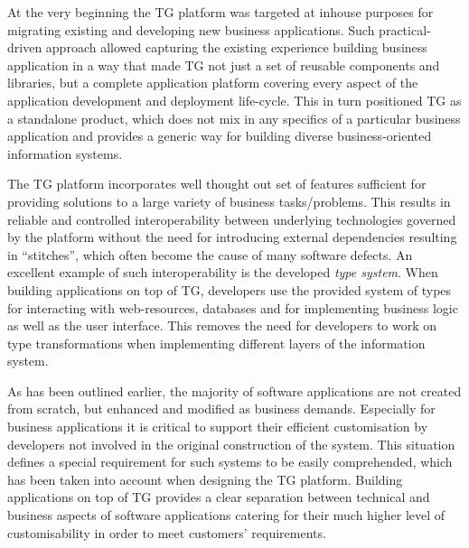   At the very beginning the TG platform was targeted at inhouse purposes for migrating existing and developing new business applications.
  Such practical-driven approach allowed capturing the existing experience building business application in a way that made TG not just a set of reusable components and libraries, but a complete application platform covering every aspect of the application development and deployment life-cycle.
  This in turn positioned TG as a standalone product, which does not mix in any specifics of a particular business application and provides a generic way for building diverse business-oriented information systems.

  The TG platform incorporates well thought out set of features sufficient for providing solutions to a large variety of business tasks/problems.
  This results in reliable and controlled interoperability between underlying technologies governed by the platform without the need for introducing external dependencies resulting in ``stitches'', which often become the cause of many software defects.
  An excellent example of such interoperability is the developed \emph{type system}.
  When building applications on top of TG, developers use the provided system of types for interacting with web-resources, databases and for implementing business logic as well as the user interface.
  This removes the need for developers to work on type transformations when implementing different layers of the information system.
  
  As has been outlined earlier, the majority of software applications are not created from scratch, but enhanced and modified as business demands.
  Especially for business applications it is critical to support their efficient customisation by developers not involved in the original construction of the system.
  This situation defines a special requirement for such systems to be easily comprehended, which has been taken into account when designing the TG platform.
  Building applications on top of TG provides a clear separation between technical and business aspects of software applications catering for their much higher level of customisability in order to meet customers' requirements.